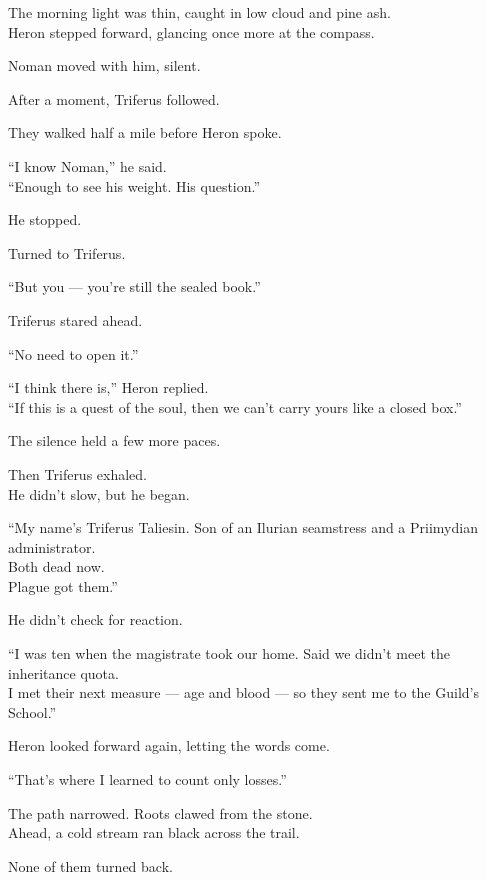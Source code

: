 \documentclass[12pt]{article}
\begin{document}
The morning light was thin, caught in low cloud and pine ash.\\
Heron stepped forward, glancing once more at the compass.

Noman moved with him, silent.

After a moment, Triferus followed.

\vspace{1em}

They walked half a mile before Heron spoke.

“I know Noman,” he said.\\
“Enough to see his weight. His question.”

He stopped.

Turned to Triferus.

“But you — you’re still the sealed book.”

Triferus stared ahead.

“No need to open it.”

“I think there is,” Heron replied.\\
“If this is a quest of the soul, then we can’t carry yours like a closed box.”

\vspace{1em}

The silence held a few more paces.

Then Triferus exhaled.\\
He didn’t slow, but he began.

“My name’s Triferus Taliesin. Son of an Ilurian seamstress and a Priimydian administrator.\\
Both dead now.\\
Plague got them.”

He didn’t check for reaction.

“I was ten when the magistrate took our home. Said we didn’t meet the inheritance quota.\\
I met their next measure — age and blood — so they sent me to the Guild’s School.”

Heron looked forward again, letting the words come.

“That’s where I learned to count only losses.”

\vspace{1em}

The path narrowed. Roots clawed from the stone.\\
Ahead, a cold stream ran black across the trail.

None of them turned back.
\end{document}

